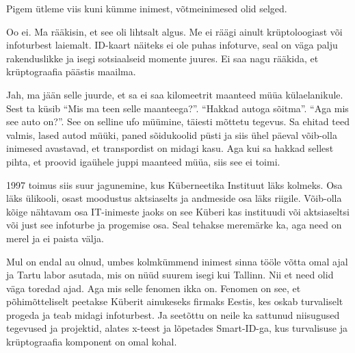 Pigem ütleme viis kuni kümme inimest, võtmeinimesed olid selged.


Oo ei. Ma rääkisin, et see oli lihtsalt algus. Me ei räägi ainult 
krüptoloogiast või infoturbest laiemalt. ID-kaart näiteks ei ole  puhas 
infoturve, seal on väga palju rakenduslikke ja isegi sotsiaalseid  momente 
juures. Ei saa nagu rääkida, et krüptograafia päästis maailma. 


Jah, ma jään selle juurde, et sa ei saa kilomeetrit maanteed müüa 
külaelanikule. Sest ta küsib \enquote{Mis ma teen selle maanteega?}. 
\enquote{Hakkad autoga sõitma}. \enquote{Aga mis see auto on?}. See on selline 
ufo müümine, täiesti mõttetu tegevus. Sa ehitad teed valmis, lased autod müüki, 
paned sõidukoolid püsti ja siis ühel päeval võib-olla inimesed avastavad, et 
transpordist on midagi kasu. Aga kui sa hakkad sellest pihta, et proovid 
igaühele  juppi maanteed müüa, siis see ei toimi. 


1997 toimus siis suur jagunemine, kus Küberneetika Instituut läks kolmeks. Osa 
läks ülikooli, osast moodustus aktsiaselts ja andmeside osa läks  riigile. 
Võib-olla kõige nähtavam osa IT-inimeste jaoks on see Küberi kas instituudi või 
aktsiaseltsi või just see infoturbe ja progemise osa. Seal tehakse meremärke 
ka, aga need on merel ja ei paista välja.

Mul on endal au olnud, umbes kolmkümmend inimest sinna tööle võtta omal ajal ja 
Tartu labor asutada, mis on nüüd suurem 
isegi kui Tallinn. Nii et need olid väga toredad ajad. Aga mis selle fenomen 
ikka on. Fenomen on see, et põhimõtteliselt peetakse Küberit ainukeseks firmaks 
Eestis, kes oskab turvaliselt progeda ja teab midagi infoturbest. Ja seetõttu 
on neile ka sattunud niisugused tegevused ja projektid,  alates x-teest ja 
lõpetades Smart-ID-ga, kus  turvalisuse ja krüptograafia komponent on omal 
kohal. 

